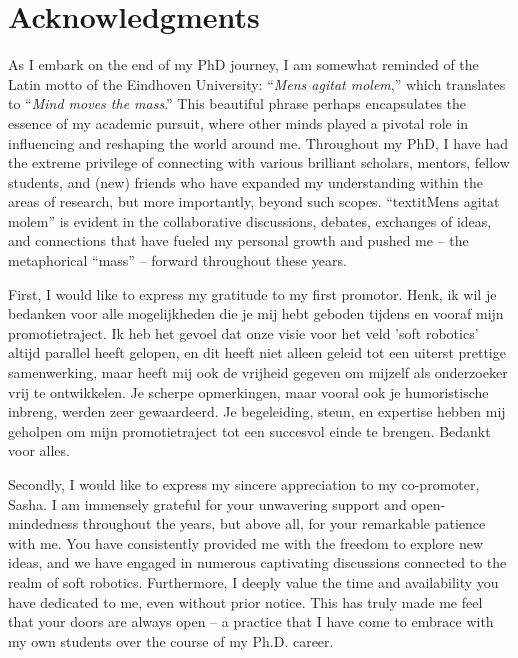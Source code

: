 \chapter*{Acknowledgments}
\vspace{-5mm}



As I embark on the end of my PhD journey, I am somewhat reminded of the Latin motto of the Eindhoven University: ``\textit{Mens agitat molem},'' which translates to ``\textit{Mind moves the mass}.'' This beautiful phrase perhaps encapsulates the essence of my academic pursuit, where other minds played a pivotal role in influencing and reshaping the world around me. Throughout my PhD, I have had the extreme privilege of connecting with various brilliant scholars, mentors, fellow students, and (new) friends who have expanded my understanding within the areas of research, but more importantly, beyond such scopes. ``textit{Mens agitat molem}'' is evident in the collaborative discussions, debates, exchanges of ideas, and connections that have fueled my personal growth and pushed me -- the metaphorical ``mass'' -- forward throughout these years.

First, I would like to express my gratitude to my first promotor. Henk, ik wil je bedanken  voor alle mogelijkheden die je mij hebt geboden tijdens en vooraf mijn promotietraject. Ik heb het gevoel dat onze visie voor het veld 'soft robotics' altijd parallel heeft gelopen, en dit heeft niet alleen geleid tot een uiterst prettige samenwerking, maar heeft mij ook de vrijheid gegeven om mijzelf als onderzoeker vrij te ontwikkelen. Je scherpe opmerkingen, maar vooral ook je humoristische inbreng, werden zeer gewaardeerd. Je begeleiding, steun, en expertise hebben mij geholpen om mijn promotietraject tot een succesvol einde te brengen. Bedankt voor alles.

Secondly, I would like to express my sincere appreciation to my co-promoter, Sasha. I am immensely grateful for your unwavering support and open-mindedness throughout the years, but above all, for your remarkable patience with me. You have consistently provided me with the freedom to explore new ideas, and we have engaged in numerous captivating discussions connected to the realm of soft robotics. Furthermore, I deeply value the time and availability you have dedicated to me, even without prior notice. This has truly made me feel that your doors are always open – a practice that I have come to embrace with my own students over the course of my Ph.D. career.

